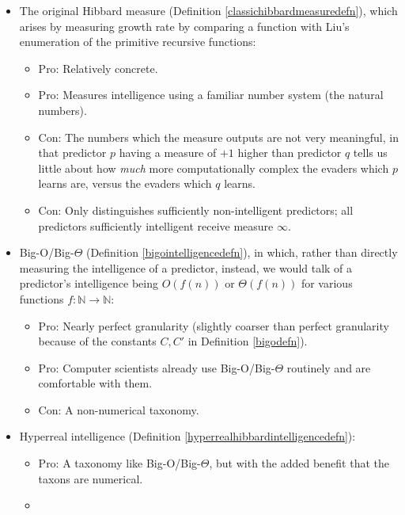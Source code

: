 \documentclass[twoside,11pt]{article}
\begin{document}
\begin{itemize}
    \item
    The original Hibbard measure (Definition \ref{classichibbardmeasuredefn}),
    which arises by measuring growth rate by comparing
    a function with Liu's enumeration \citep{liu1960enumeration} of the primitive
    recursive functions:
    \begin{itemize}
        \item
        Pro: Relatively concrete.
        \item
        Pro: Measures intelligence using a familiar number system (the natural numbers).
        \item
        Con: The numbers which the measure outputs are not very meaningful, in
        that predictor $p$ having a measure of
        $+1$ higher than predictor $q$ tells us little
        about how \emph{much} more computationally complex the evaders which $p$
        learns are, versus the evaders which $q$ learns.
        \item
        Con: Only distinguishes sufficiently non-intelligent predictors; all predictors
        sufficiently intelligent receive measure $\infty$.
    \end{itemize}
    \item
    Big-O/Big-$\Theta$ (Definition \ref{bigointelligencedefn}),
    in which, rather than directly measuring the intelligence of a predictor, instead, we
    would talk of a predictor's intelligence being $O(f(n))$ or $\Theta(f(n))$
    for various functions $f:\mathbb N\to\mathbb N$:
    \begin{itemize}
        \item
        Pro: Nearly perfect granularity (slightly coarser than perfect granularity because
        of the constants $C,C'$ in Definition \ref{bigodefn}).
        \item
        Pro: Computer scientists already use Big-O/Big-$\Theta$ routinely
        and are comfortable with them.
        \item
        Con: A non-numerical taxonomy.
    \end{itemize}
    \item
    Hyperreal intelligence (Definition \ref{hyperrealhibbardintelligencedefn}):
    \begin{itemize}
        \item
        Pro: A taxonomy like Big-O/Big-$\Theta$, but with the added benefit
        that the taxons are numerical.
        \item

\end{itemize}
\end{itemize}
\end{document}
